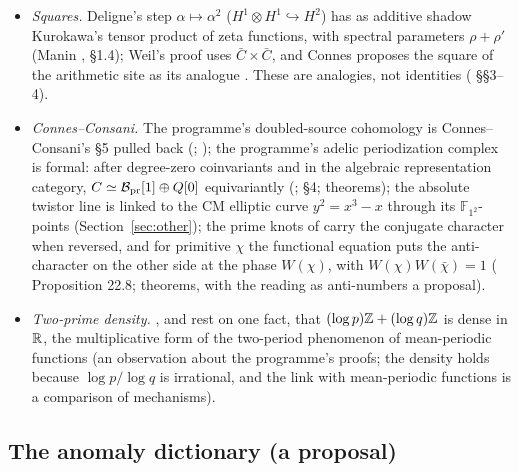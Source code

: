 \begin{itemize}
\item \emph{Squares.} Deligne's step $\alpha\mapsto\alpha^2$ ($H^1\otimes H^1\hookrightarrow H^2$) has as additive shadow Kurokawa's tensor product of zeta functions, with spectral parameters $\rho+\rho'$ (Manin \cite{Manin}, §1.4); Weil's proof uses $\bar C\times\bar C$, and Connes proposes the square of the arithmetic site as its analogue \cite{ConnesSquare}. These are analogies, not identities ( §§3--4).
\item \emph{Connes--Consani.} The programme's doubled-source cohomology is Connes--Consani's §5 \cite{CCP1} pulled back (; ); the programme's adelic periodization complex is formal: after degree-zero coinvariants and in the algebraic representation category, $C\simeq\mathcal{B}_{\mathrm{pr}}[1]\oplus Q[0]$ equivariantly (;  §4; theorems); the absolute twistor line \cite{CCtwistor} is linked to the CM elliptic curve $y^2=x^3-x$ through its $\mathbb{F}_{1^2}$-points (Section~\ref{sec:other}); the prime knots of \cite{CCknots} carry the conjugate character when reversed, and for primitive $\chi$ the functional equation puts the anti-character on the other side at the phase $W(\chi)$, with $W(\chi)W(\bar\chi)=1$ ( Proposition 22.8; theorems, with the reading as anti-numbers a proposal).
\item \emph{Two-prime density.} ,  and  rest on one fact, that $(\log p)\mathbb{Z}+(\log q)\mathbb{Z}$ is dense in $\mathbb{R}$, the multiplicative form of the two-period phenomenon of mean-periodic functions \cite{SchwartzMP} (an observation about the programme's proofs; the density holds because $\log p/\log q$ is irrational, and the link with mean-periodic functions is a comparison of mechanisms).
\end{itemize}

\subsection{The anomaly dictionary (a proposal)}


